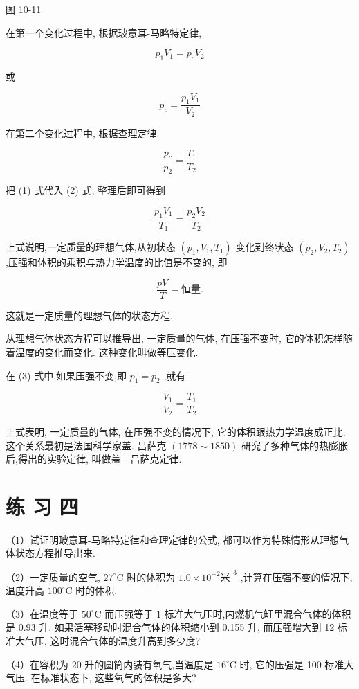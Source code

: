 \documentclass[10pt]{article}
\begin{document}
图 10-11

在第一个变化过程中, 根据玻意耳-马略特定律,

\[
{p}_{1}{V}_{1} = {p}_{c}{V}_{2}
\]

或

\[
{p}_{c} = \frac{{p}_{1}{V}_{1}}{{V}_{2}} \tag{1}
\]

在第二个变化过程中, 根据查理定律

\[
\frac{{p}_{c}}{{p}_{2}} = \frac{{T}_{1}}{{T}_{2}} \tag{2}
\]

把 (1) 式代入 (2) 式, 整理后即可得到

\[
\frac{{p}_{1}{V}_{1}}{{T}_{1}} = \frac{{p}_{2}{V}_{2}}{{T}_{2}} \tag{3}
\]

上式说明,一定质量的理想气体,从初状态 \(\left( {{p}_{1},{V}_{1},{T}_{1}}\right)\) 变化到终状态 \(\left( {{p}_{2},{V}_{2},{T}_{2}}\right)\) ,压强和体积的乘积与热力学温度的比值是不变的, 即

\[
\frac{pV}{T} = \text{恒量.}
\]

这就是一定质量的理想气体的状态方程.

从理想气体状态方程可以推导出, 一定质量的气体, 在压强不变时, 它的体积怎样随着温度的变化而变化. 这种变化叫做等压变化.

在 (3) 式中,如果压强不变,即 \({p}_{1} = {p}_{2}\) ,就有

\[
\frac{{V}_{1}}{{V}_{2}} = \frac{{T}_{1}}{{T}_{2}}
\]

上式表明, 一定质量的气体, 在压强不变的情况下, 它的体积跟热力学温度成正比. 这个关系最初是法国科学家盖. 吕萨克 \(\left( {{1778} \sim {1850}}\right)\) 研究了多种气体的热膨胀后,得出的实验定律, 叫做盖 - 吕萨克定律.

\section*{练 习 四}

（1）试证明玻意耳-马略特定律和查理定律的公式, 都可以作为特殊情形从理想气体状态方程推导出来.

（2）一定质量的空气, \({27}^{ \circ }\mathrm{C}\) 时的体积为 \({1.0} \times {10}^{-2}{\text{米 }}^{3}\) ,计算在压强不变的情况下,温度升高 \({100}^{ \circ }\mathrm{C}\) 时的体积.

（3）在温度等于 \({50}^{ \circ }\mathrm{C}\) 而压强等于 1 标准大气压时,内燃机气缸里混合气体的体积是 0.93 升. 如果活塞移动时混合气体的体积缩小到 0.155 升, 而压强增大到 12 标准大气压, 这时混合气体的温度升高到多少度?

（4）在容积为 20 升的圆筒内装有氧气,当温度是 \({16}^{ \circ }\mathrm{C}\) 时, 它的压强是 100 标准大气压. 在标准状态下, 这些氧气的体积是多大?
\end{document}
